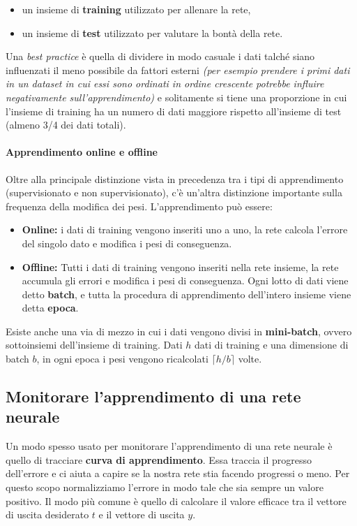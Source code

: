 \documentclass[12pt, twoside, letterpaper]{report}
\begin{document}
			\begin{itemize}
				\item un insieme di \textbf{training} utilizzato per allenare la rete,
				\item un insieme di \textbf{test} utilizzato per valutare la bontà della rete.
			\end{itemize}
			Una \textit{best practice} è quella di dividere in modo casuale i dati talché siano influenzati il meno possibile da fattori esterni \textit{(per esempio prendere i primi dati in un dataset in cui essi sono ordinati in ordine crescente potrebbe influire negativamente sull'apprendimento)} e solitamente si tiene una proporzione in cui l'insieme di training ha un numero di dati maggiore rispetto all'insieme di test (almeno 3/4 dei dati totali). 

			\paragraph{Apprendimento online e offline} Oltre alla principale distinzione vista in precedenza tra i tipi di apprendimento (supervisionato e non supervisionato), c'è un'altra distinzione importante sulla frequenza della modifica dei pesi. L'apprendimento può essere: 
				\begin{itemize}
					\item \textbf{Online:} i dati di training vengono inseriti uno a uno, la rete calcola l'errore del singolo dato e modifica i pesi di conseguenza.
					\item \textbf{Offline:} Tutti i dati di training vengono inseriti nella rete insieme, la rete accumula gli errori e modifica i pesi di conseguenza. Ogni lotto di dati viene detto \textbf{batch}, e tutta la procedura di apprendimento dell'intero insieme viene detta \textbf{epoca}.
				\end{itemize}
				Esiste anche una via di mezzo in cui i dati vengono divisi in \textbf{mini-batch}, ovvero sottoinsiemi dell'insieme di training. Dati $h$ dati di training e una dimensione di batch $b$, in ogni epoca i pesi vengono ricalcolati $\lceil h/b \rceil$ volte.
			
			\subsection{Monitorare l'apprendimento di una rete neurale}
				Un modo spesso usato per monitorare l'apprendimento di una rete neurale è quello di tracciare \textbf{curva di apprendimento}. Essa traccia il progresso dell'errore e ci aiuta a capire se la nostra rete stia facendo progressi o meno. Per questo scopo normalizziamo l'errore in modo tale che sia sempre un valore positivo. Il modo più comune è quello di calcolare il valore efficace tra il vettore di uscita desiderato $t$ e il vettore di uscita $y$. 
\end{document}
